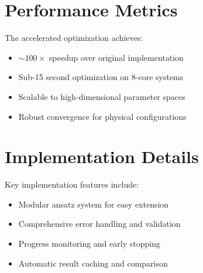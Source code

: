 \documentclass[12pt]{article}
\begin{document}
\section{Performance Metrics}

The accelerated optimization achieves:
\begin{itemize}
\item \(\sim 100\times\) speedup over original implementation
\item Sub-15 second optimization on 8-core systems
\item Scalable to high-dimensional parameter spaces
\item Robust convergence for physical configurations
\end{itemize}

\section{Implementation Details}

Key implementation features include:
\begin{itemize}
\item Modular ansatz system for easy extension
\item Comprehensive error handling and validation
\item Progress monitoring and early stopping
\item Automatic result caching and comparison
\end{itemize}
\end{document}
